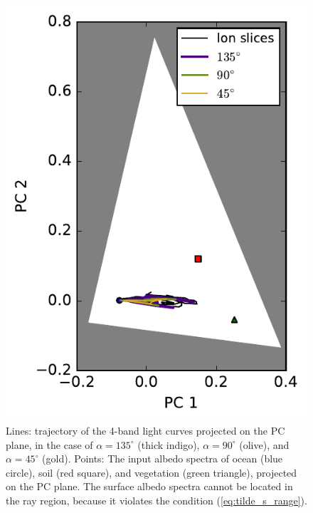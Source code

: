 \documentclass[iop,numberedappendix,apj,]{emulateapj}
\begin{document}
\begin{figure}[t]
    \begin{center}
\includegraphics[width=\hsize]{mockdata_3types_t360_lc_PCplane.pdf}
    \end{center}
    \caption{Lines: trajectory of the 4-band light curves projected on the PC plane, in the case of $\alpha = 135^{\circ }$ (thick indigo), $\alpha = 90^{\circ }$ (olive), and $\alpha = 45^{\circ }$ (gold). Points: The input albedo spectra of ocean (blue circle), soil (red square), and vegetation (green triangle), projected on the PC plane. The surface albedo spectra cannot be located in the ray region, because it violates the condition (\ref{eq:tilde_s_range}). }
    \label{fig:trajectory}
\end{figure}

\end{document}
